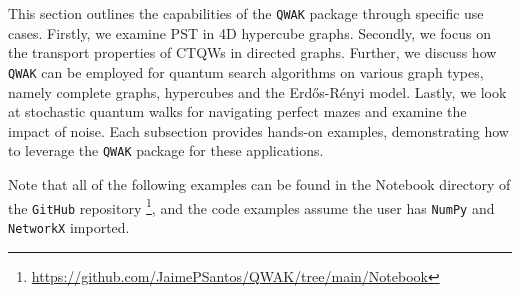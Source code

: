\documentclass[main.tex]{subfiles}
\begin{document}
This section outlines the capabilities of the \texttt{QWAK} package through
specific use cases. Firstly, we examine PST in 4D hypercube graphs. Secondly,
we focus on the transport properties of CTQWs in directed graphs. Further, we
discuss how \texttt{QWAK} can be employed for quantum search algorithms on
various graph types, namely complete graphs, hypercubes and the Erdős-Rényi
model. Lastly, we look at stochastic quantum walks for navigating perfect mazes
and examine the impact of noise. Each subsection provides hands-on examples,
demonstrating how to leverage the \texttt{QWAK} package for these
applications.\par

Note that all of the following examples can be found in the Notebook directory
of the \texttt{GitHub} repository
\footnote{\url{https://github.com/JaimePSantos/QWAK/tree/main/Notebook}}, and the
code examples assume the user has \texttt{NumPy} and \texttt{NetworkX}
imported.
\end{document}
